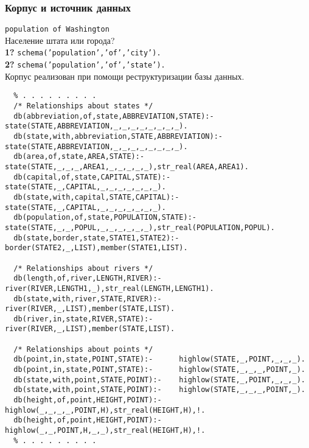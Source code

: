\documentclass[10pt]{beamer}
\begin{document}
\begin{frame}[fragile]
  \frametitle{Корпус и источник данных}
  \texttt{population of Washington}\\
  Население штата или города?\\
  \textbf{1?} \texttt{schema('population','of','city').}\\
  \textbf{2?} \texttt{schema('population','of','state').}\\
  Корпус реализован при помощи реструктуризации базы данных.
\begin{verbatim}
  % . . . . . . . . .
  /* Relationships about states */
  db(abbreviation,of,state,ABBREVIATION,STATE):-  state(STATE,ABBREVIATION,_,_,_,_,_,_,_,_).
  db(state,with,abbreviation,STATE,ABBREVIATION):-state(STATE,ABBREVIATION,_,_,_,_,_,_,_,_).
  db(area,of,state,AREA,STATE):-        state(STATE,_,_,_,AREA1,_,_,_,_,_),str_real(AREA,AREA1).
  db(capital,of,state,CAPITAL,STATE):-  state(STATE,_,CAPITAL,_,_,_,_,_,_,_).
  db(state,with,capital,STATE,CAPITAL):-state(STATE,_,CAPITAL,_,_,_,_,_,_,_).
  db(population,of,state,POPULATION,STATE):-state(STATE,_,_,POPUL,_,_,_,_,_,_),str_real(POPULATION,POPUL).
  db(state,border,state,STATE1,STATE2):-border(STATE2,_,LIST),member(STATE1,LIST).

  /* Relationships about rivers */
  db(length,of,river,LENGTH,RIVER):-    river(RIVER,LENGTH1,_),str_real(LENGTH,LENGTH1).
  db(state,with,river,STATE,RIVER):-    river(RIVER,_,LIST),member(STATE,LIST).
  db(river,in,state,RIVER,STATE):-      river(RIVER,_,LIST),member(STATE,LIST).

  /* Relationships about points */
  db(point,in,state,POINT,STATE):-      highlow(STATE,_,POINT,_,_,_).
  db(point,in,state,POINT,STATE):-      highlow(STATE,_,_,_,POINT,_).
  db(state,with,point,STATE,POINT):-    highlow(STATE,_,POINT,_,_,_).
  db(state,with,point,STATE,POINT):-    highlow(STATE,_,_,_,POINT,_).
  db(height,of,point,HEIGHT,POINT):-    highlow(_,_,_,_,POINT,H),str_real(HEIGHT,H),!.
  db(height,of,point,HEIGHT,POINT):-    highlow(_,_,POINT,H,_,_),str_real(HEIGHT,H),!.
  % . . . . . . . . .
\end{verbatim}
\end{frame}
\end{document}
